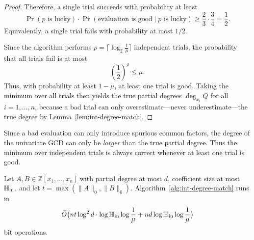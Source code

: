 \documentclass{article}
\numberwithin{equation}{section}
\begin{document}
\begin{proof}
Therefore, a single trial succeeds with probability at least
\[
\Pr(p \text{ is lucky}) \cdot \Pr(\text{evaluation is good} \mid p \text{ is lucky})
\ge \frac{2}{3} \cdot \frac{3}{4}
= \frac{1}{2}.
\]
Equivalently, a single trial fails with probability at most $1/2$.

Since the algorithm performs $\rho = \lceil \log_2\frac{1}{\mu} \rceil$ independent trials, the probability that all trials fail is at most
\[
\left(\frac{1}{2}\right)^\rho \le \mu.
\]
Thus, with probability at least $1-\mu$, at least one trial is good. Taking the minimum over all trials then yields the true partial degrees $\deg_{x_i} Q$ for all $i=1,\dots,n$, because a bad trial can only overestimate---never underestimate---the true degree by Lemma~\ref{lem:int-degree-match}.
\end{proof}





\begin{remarkstar}
Since a bad evaluation can only introduce spurious common factors, the degree of the univariate GCD can only be \emph{larger} than the true partial degree. Thus the minimum over independent trials is always correct whenever at least one trial is good.
\end{remarkstar}



\begin{theorem}\label{thm:int-degree-match-complexity}
Let $A, B \in \mathbb{Z}[x_1,\dots,x_n]$ with partial degree at most $d$, coefficient size at most $\mathbb{H}_{\rm in}$, and let $t = \max(\|A\|_0, \|B\|_0)$. Algorithm~\ref{alg:int-degree-match} runs in
\[
\widetilde{O}\bigl( n t \log^2 d \cdot \log \mathbb{H}_{\rm in} \log\frac{1}{\mu} + n d \log \mathbb{H}_{\rm in} \log\frac{1}{\mu} \bigr)
\]
bit operations.
\end{theorem}
\end{document}
